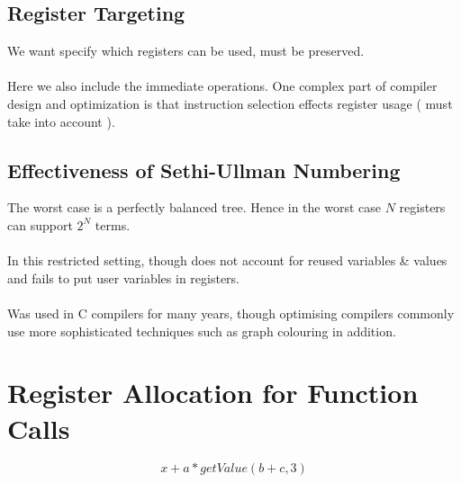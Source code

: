 \documentclass{report}
\begin{document}
        \subsection*{Register Targeting}
            We want specify which registers can be used, must be preserved.
            \\
            \\ Here we also include the immediate operations. One complex part of compiler design and optimization is that instruction selection effects register usage ( must take into account ).
        \subsection*{Effectiveness of Sethi-Ullman Numbering}
            The worst case is a perfectly balanced tree.
            Hence in the worst case $N$ registers can support $2^N$ terms.
            \\
            \\ In this restricted setting, though does not account for reused variables \& values and fails to put user variables in registers.
            \\
            \\ Was used in C compilers for many years, though optimising compilers commonly use more sophisticated techniques such as graph colouring in addition.
        
    \section*{Register Allocation for Function Calls}
        \[x + a * getValue(b + c, 3)\]
\end{document}
